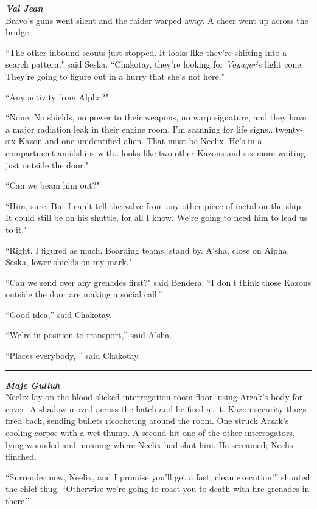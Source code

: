 \documentclass[twoside,letterpaper,12pt]{memoir}
\begin{document}
\noindent\textit{\textbf{Val Jean}}\\

Bravo’s guns went silent and the raider warped away. A cheer went up across the bridge.

``The other inbound scouts just stopped. It looks like they're shifting into a search pattern," said Seska. ``Chakotay, they're looking for \textit{Voyager}'s light cone. They're going to figure out in a hurry that she's not here." 

``Any activity from Alpha?"

``None. No shields, no power to their weapons, no warp signature, and they have a major radiation leak in their engine room. I'm scanning for life signs...twenty-six Kazon and one unidentified alien. That must be Neelix. He’s in a compartment amidships with...looks like two other Kazons and six more waiting just outside the door."

``Can we beam him out?"

``Him, sure. But I can’t tell the valve from any other piece of metal on the ship. It could still be on his shuttle, for all I know. We’re going to need him to lead us to it."

``Right, I figured as much. Boarding teams, stand by. A'sha, close on Alpha. Seska, lower shields on my mark."

``Can we send over any grenades first?" said Bendera. ``I don’t think those Kazons outside the door are making a social call.”

``Good idea,” said Chakotay.

``We’re in position to transport,” said A’sha.

``Places everybody, ” said Chakotay.

\begin{center}\rule{3cm}{0.4 pt}\end{center}

\noindent\textit{\textbf{Maje Gulluh}}\\

Neelix lay on the blood-slicked interrogation room floor, using Arzak's body for cover. A shadow moved across the hatch and he fired at it. Kazon security thugs fired back, sending bullets ricocheting around the room. One struck Arzak’s cooling corpse with a wet thump. A second hit one of the other interrogators, lying wounded and moaning where Neelix had shot him. He screamed; Neelix flinched.

``Surrender now, Neelix, and I promise you’ll get a fast, clean execution!” shouted the chief thug. ``Otherwise we’re going to roast you to death with fire grenades in there.”
\end{document}
